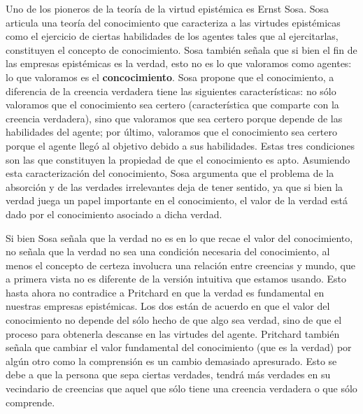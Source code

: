 \documentclass{article}
\begin{document}
Uno de los pioneros de la teoría de la virtud epistémica es Ernst Sosa. Sosa \citeyear{Sosa2017-SOSE} articula una teoría del conocimiento que caracteriza a las virtudes epistémicas como el ejercicio de ciertas habilidades de los agentes tales que al ejercitarlas, constituyen el concepto de conocimiento. Sosa también señala que si bien el fin de las empresas epistémicas es la verdad, esto no es lo que valoramos como agentes: lo que valoramos es el \textbf{concocimiento}. Sosa \citeyear[pp. 11-113]{Sosa2017-SOSE} propone que el conocimiento, a diferencia de la creencia verdadera tiene las siguientes características: no sólo valoramos que el conocimiento sea certero (característica que comparte con la creencia verdadera), sino que valoramos que sea certero porque depende de las habilidades del agente; por último, valoramos que el conocimiento sea certero porque el agente llegó al objetivo debido a sus habilidades. Estas tres condiciones son las que constituyen la propiedad de que el conocimiento es apto. Asumiendo esta caracterización del conocimiento, Sosa argumenta que el problema de la absorción y de las verdades irrelevantes deja de tener sentido, ya que si bien la verdad juega un papel importante en el conocimiento, el valor de la verdad está dado por el conocimiento asociado a dicha verdad.

Si bien Sosa señala que la verdad no es en lo que recae el valor del conocimiento, no señala que la verdad no sea una condición necesaria del conocimiento, al menos el concepto de certeza involucra una relación entre creencias y mundo, que a primera vista no es diferente de la versión intuitiva que estamos usando. Esto hasta ahora no contradice a Pritchard en que la verdad es fundamental en nuestras empresas epistémicas. Los dos están de acuerdo en que el valor del conocimiento no depende del sólo hecho de que algo sea verdad, sino de que el proceso para obtenerla descanse en las virtudes del agente. Pritchard también señala que cambiar el valor fundamental del conocimiento (que es la verdad) por algún otro como la comprensión es un cambio demasiado apresurado. Esto se debe a que la persona que sepa ciertas verdades, tendrá más verdades en su vecindario de creencias que aquel que sólo tiene una creencia verdadera o que sólo comprende.
\end{document}
